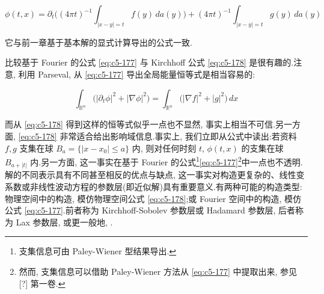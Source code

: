 \begin{equation}
\phi(t, x) = \partial_t\Big((4\pi t)^{-1}\int_{|x-y|=t} f(y)\, da(y)\Big) + (4\pi t)^{-1}\int_{|x-y|=t} g(y)\, da(y)\label{eq:c5-178}
\end{equation}

它与前一章基于基本解的显式计算导出的公式一致.

比较基于 Fourier 的公式 \eqref{eq:c5-177} 与 Kirchhoff 公式 \eqref{eq:c5-178} 是很有趣的.注意, 利用 Parseval, 从 \eqref{eq:c5-177} 导出全局能量恒等式是相当容易的:

\[
\int_{\mathbb{R}^n}\big(|\partial_t\phi|^2 + |\nabla\phi|^2\big) = \int_{\mathbb{R}^n}\big(|\nabla f|^2 + |g|^2\big)\, dx
\]

而从 \eqref{eq:c5-178} 得到这样的恒等式似乎一点也不显然, 事实上相当不可信.另一方面, \eqref{eq:c5-178} 非常适合给出影响域信息.事实上, 我们立即从公式中读出:若资料 $f, g$ 支集在球 $B_a = \{|x-x_0|\leq a\}$ 内, 则对任何时刻 $t$, $\phi(t, x)$ 的支集在球 $B_{a+|t|}$ 内.另一方面, 这一事实在基于 Fourier 的公式\footnote{支集信息可由 Paley-Wiener 型结果导出.}\eqref{eq:c5-177}\footnote{然而, 支集信息可以借助 Paley-Wiener 方法从 \eqref{eq:c5-177} 中提取出来, 参见 [?] 第一卷.}中一点也不透明.解的不同表示具有不同甚至相反的优点与缺点, 这一事实对构造更复杂的、线性变系数或非线性波动方程的参数层(即近似解)具有重要意义.有两种可能的构造类型:物理空间中的构造, 模仿物理空间公式 \eqref{eq:c5-178};或 Fourier 空间中的构造, 模仿公式 \eqref{eq:c5-177}.前者称为 Kirchhoff-Sobolev 参数层或 Hadamard 参数层, 后者称为 Lax 参数层, 或更一般地, .
